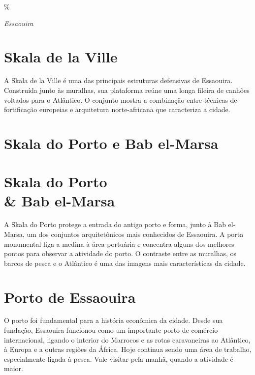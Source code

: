 \%%

\blankpage
\pagebreak
\thispagestyle{empty}
\mbox{}
\begin{center}

\vspace{3cm}

{\brabo\HUGE\itshape Essaouira}
\end{center}
\pagebreak


\chapter{Skala de la Ville}

A Skala de la Ville é uma das principais estruturas defensivas de Essaouira. Construída junto às muralhas, sua plataforma reúne uma longa fileira de canhões voltados para o Atlântico. O conjunto mostra a combinação entre técnicas de fortificação europeias e arquitetura norte-africana que caracteriza a cidade.

\chapter{Skala do Porto e Bab el-Marsa}
\chapter*{Skala do Porto\\ \& Bab el-Marsa}

A Skala do Porto protege a entrada do antigo porto e forma, junto à Bab el-Marsa, um dos conjuntos arquitetônicos mais conhecidos de Essaouira. A porta monumental liga a medina à área portuária e concentra alguns dos melhores pontos para observar a atividade do porto. O contraste entre as muralhas, os barcos de pesca e o Atlântico é uma das imagens mais características da cidade.

\chapter{Porto de Essaouira}

O porto foi fundamental para a história econômica da cidade. Desde sua fundação, Essaouira funcionou como um importante porto de comércio internacional, ligando o interior do Marrocos e as rotas caravaneiras ao Atlântico, à Europa e a outras regiões da África. Hoje continua sendo uma área de trabalho, especialmente ligada à pesca. Vale visitar pela manhã, quando a atividade é maior.


